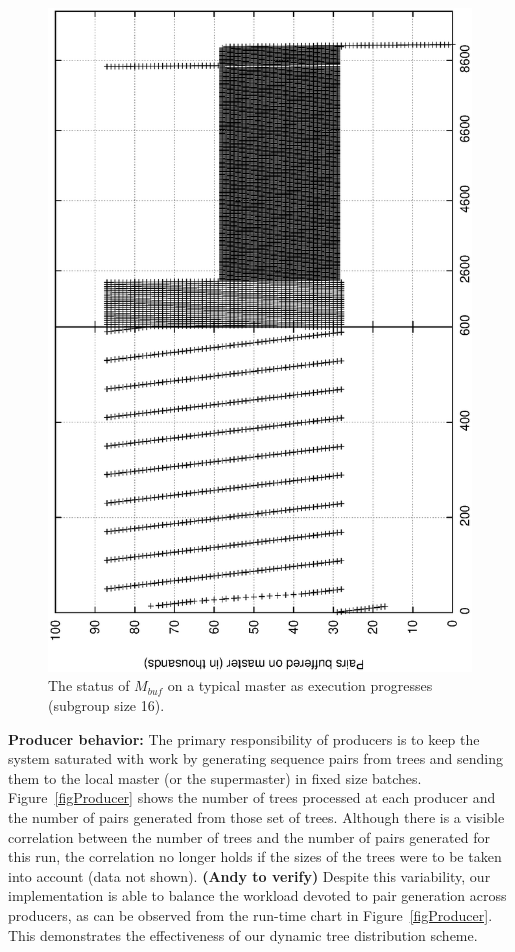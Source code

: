 \documentclass[10pt,journal,letterpaper,compsoc]{IEEEtran}
\begin{document}
\begin{figure}[tb]
\centerline{
						\includegraphics[angle=-90, scale=0.33]{Group.pBuf.eps}
            }
\caption{
The status of $M_{buf}$ on a typical master as execution progresses (subgroup size 16). 
}
\label{figMBuffer}
\end{figure}

{\bf Producer behavior:} The primary responsibility of producers is to keep the system saturated with work by generating sequence pairs from trees and sending them to the local master (or the supermaster) in fixed size batches. Figure~\ref{figProducer} shows the number of trees processed at each producer and the number of pairs generated from those set of trees. Although there is a visible correlation between the number of trees and the number of pairs generated for this run, the correlation no longer holds if the sizes of the trees were to be taken into account (data not shown). {\bf (Andy to verify)} Despite this variability, our implementation is able to balance the workload devoted to pair generation across producers, as can be observed from the run-time chart in Figure~\ref{figProducer}. This demonstrates the effectiveness of our dynamic tree distribution scheme. 
\end{document}
